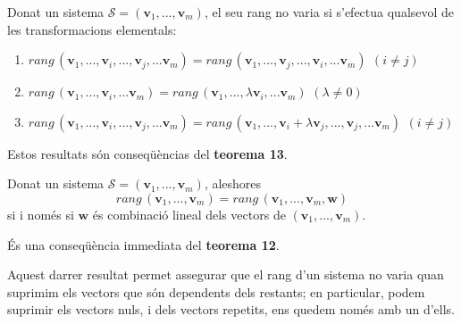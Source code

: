 \begin{corollari}
Donat un sistema $\mathcal{S}=(\mathbf{v}_{1},...,\mathbf{v}_{m})$, el seu rang
no varia si s'efectua qualsevol de les transformacions
elementals:

\begin{enumerate}
\item $rang\,\left( \mathbf{v}_{1},...,\mathbf{v}_{i},...,\mathbf{v}_{j},...%
\mathbf{v}_{m}\right) =rang\,\left( \mathbf{v}_{1},...,\mathbf{v}_{j},...,%
\mathbf{v}_{i},...\mathbf{v}_{m}\right) \,\ (i\neq j)$

\item $rang\,\left( \mathbf{v}_{1},...,\mathbf{v}_{i},...\mathbf{v}%
_{m}\right) =rang\,\left( \mathbf{v}_{1},...,\lambda \mathbf{v}_{i},...%
\mathbf{v}_{m}\right) $ $(\lambda \neq 0)$

\item $rang\,\left( \mathbf{v}_{1},...,\mathbf{v}_{i},...,\mathbf{v}_{j},...%
\mathbf{v}_{m}\right) =rang\,\left( \mathbf{v}_{1},...,\mathbf{v}%
_{i}+\lambda \mathbf{v}_{j},...,\mathbf{v}_{j},...\mathbf{v}_{m}\right) \,\
(i\neq j)$
\end{enumerate}

\end{corollari}
\begin{prova}
Estos resultats són conseqüèncias del \textbf{teorema 13}.
\end{prova}

\begin{corollari}
Donat un sistema $\mathcal{S}=(\mathbf{v}_{1},...,\mathbf{v}_{m})$, aleshores 
\begin{equation*}
rang\,(\mathbf{v}_{1},...,\mathbf{v}_{m})=rang\,(\mathbf{v}_{1},...,\mathbf{v%
}_{m},\mathbf{w})
\end{equation*}%
si i només si $\mathbf{w}$ és combinació lineal dels vectors de $(%
\mathbf{v}_{1},...,\mathbf{v}_{m})$.

\end{corollari}
\begin{prova}
És una conseqüència immediata del \textbf{teorema 12}.
\end{prova}

\begin{observacio}
Aquest darrer resultat permet assegurar que el rang d’un sistema no varia quan suprimim els vectors que són dependents dels
restants; en particular, podem suprimir els vectors nuls, i dels
vectors repetits, ens quedem només amb un d'ells.
\end{observacio}

